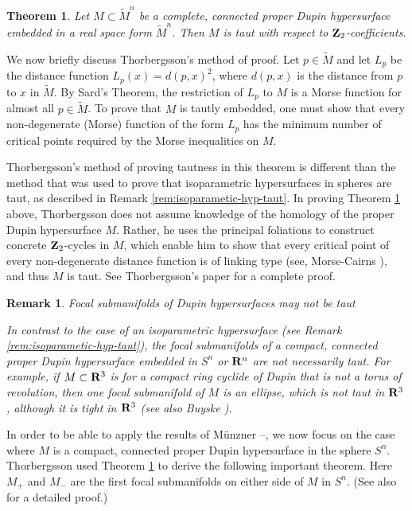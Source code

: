\documentclass[12pt]{article}
\newtheorem{theorem}{Theorem}[section]
\newtheorem{remark}{Remark}[section]
\begin{document}
{\begin{theorem}
\label{thm:proper-Dupin-implies-taut} 
Let $M \subset \widetilde{M}^n$ be a complete, connected proper Dupin hypersurface embedded in a real space form 
$\widetilde{M}^n$.  Then $M$ is taut with respect to ${\bf Z}_2$-coefficients.
\end{theorem}

We now briefly discuss Thorbergsson's method of proof.
Let $p \in \widetilde{M}$ and let $L_p$ be the distance function $L_p (x) = d(p,x)^2$, where $d(p,x)$ is the distance from $p$ to $x$ in $\widetilde{M}$.  By Sard's Theorem,
the restriction of $L_p$ to $M$ is a Morse function for almost all $p \in \widetilde{M}$.  
To prove that $M$ is tautly
embedded, one must show that every non-degenerate (Morse) function of the form $L_p$ has the minimum number of critical points required by the Morse inequalities on $M$.

Thorbergsson's method of proving tautness in this theorem is different than the
method that was used to prove that isoparametric hypersurfaces in spheres are taut,
as described in Remark \ref{rem:isoparametic-hyp-taut}.
In proving Theorem \ref{thm:proper-Dupin-implies-taut} above, Thorbergsson does not
assume knowledge of the homology of the proper Dupin hypersurface $M$. 
Rather, he uses the principal foliations to
construct concrete ${\bf Z}_2$-cycles in $M$, which enable him to show
that every critical point of every non-degenerate distance
function is of linking type (see, Morse-Cairns \cite[p. 258]{MC}), and thus $M$ is taut. 
See Thorbergsson's paper \cite{Th1} for a complete proof.


\begin{remark}{Focal submanifolds of Dupin hypersurfaces may not be taut}
\label{focal-submanifolds-not-taut}

\noindent
{\rm In contrast to the case of an isoparametric hypersurface (see Remark \ref{rem:isoparametic-hyp-taut}), the focal
submanifolds of a compact, connected proper Dupin hypersurface embedded in $S^n$ or ${\bf R}^n$ are
not necessarily taut.
For example, if $M \subset {\bf R}^3$ is 
for a compact ring cyclide of Dupin \cite[pp. 148--159]{Cec9}  that is not a torus of revolution,  then one focal
submanifold of $M$ is an ellipse, which is not taut in ${\bf R}^3$, although it is tight in ${\bf R}^3$  (see also
Buyske  \cite{Bu}).}
\end{remark} 

In order to be able to apply the results of M\"{u}nzner \cite{Mu}--\cite{Mu2},
we now focus on the case where 
$M$ is a compact, connected proper Dupin hypersurface in the sphere $S^n$.
Thorbergsson \cite{Th1} used Theorem \ref{thm:proper-Dupin-implies-taut} to derive the following
important theorem. Here $M_+$ and $M_-$ are the first focal
submanifolds on either side of $M$ in $S^n$.  (See also \cite[pp. 140--143]{CR8} for a detailed proof.)

}
\end{document}
